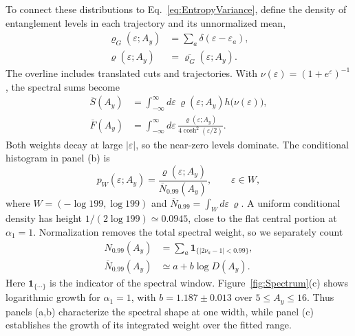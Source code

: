 \documentclass[aps,prb,10pt,twocolumn,superscriptaddress,longbibliography,floatfix]{revtex4-2}
\begin{document}
{To connect these distributions to Eq.~\eqref{eq:EntropyVariance}, define the density of entanglement levels in each trajectory and its unnormalized mean,
\begin{align}
 \varrho_G(\varepsilon;A_y)&=\sum_a\delta(\varepsilon-\varepsilon_a),\nonumber\\
 \varrho(\varepsilon;A_y)&=\overline{\varrho_G}(\varepsilon;A_y).
 \label{eq:EntanglementLevelDensity}
\end{align}
The overline includes translated cuts and trajectories. With $\nu(\varepsilon)=(1+e^\varepsilon)^{-1}$, the spectral sums become
\begin{align}
 \overline S(A_y)&=\int_{-\infty}^{\infty}d\varepsilon\,
 \varrho(\varepsilon;A_y)h\bigl(\nu(\varepsilon)\bigr),\nonumber\\
 \overline F(A_y)&=\int_{-\infty}^{\infty}d\varepsilon\,
 \frac{\varrho(\varepsilon;A_y)}{4\cosh^2(\varepsilon/2)}.
 \label{eq:SpectralEntropyVariance}
\end{align}
Both weights decay at large $|\varepsilon|$, so the near-zero levels dominate. The conditional histogram in panel (b) is
\begin{equation}
 p_W(\varepsilon;A_y)=\frac{\varrho(\varepsilon;A_y)}{\overline N_{0.99}(A_y)},
 \qquad \varepsilon\in W,
 \label{eq:ConditionalSpectralDensity}
\end{equation}
where $W=(-\log199,\log199)$ and $\overline N_{0.99}=\int_Wd\varepsilon\,\varrho$. A uniform conditional density has height $1/(2\log199)\simeq0.0945$, close to the flat central portion at $\alpha_1=1$. Normalization removes the total spectral weight, so we separately count
\begin{align}
 N_{0.99}(A_y)&=\sum_a\mathbf1_{\{|2\nu_a-1|<0.99\}},\nonumber\\
 \overline N_{0.99}(A_y)&\simeq a+b\log D(A_y).
 \label{eq:WindowCount}
\end{align}
Here $\mathbf1_{\{\cdots\}}$ is the indicator of the spectral window. Figure~\ref{fig:Spectrum}(c) shows logarithmic growth for $\alpha_1=1$, with $b=1.187\pm0.013$ over $5\leq A_y\leq16$. Thus panels (a,b) characterize the spectral shape at one width, while panel (c) establishes the growth of its integrated weight over the fitted range.

}
\end{document}
